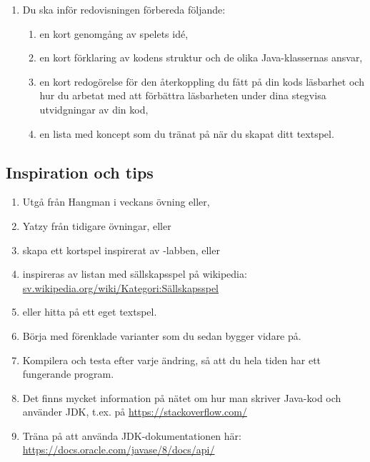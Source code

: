 \begin{enumerate}
  \item Du ska inför redovisningen förbereda följande:
  \begin{enumerate}
    \item en kort genomgång av spelets idé,
    \item en kort förklaring av kodens struktur och de olika Java-klassernas ansvar,
    \item en kort redogörelse för den återkoppling du fått på din kods läsbarhet och hur du arbetat med att förbättra läsbarheten under dina stegvisa utvidgningar av din kod,
    \item en lista med koncept som du tränat på när du skapat ditt textspel.
  \end{enumerate}
\end{enumerate}

\subsection{Inspiration och tips}

\begin{enumerate}
  \item Utgå från Hangman i veckans övning eller,
  \item Yatzy från tidigare övningar, eller
  \item skapa ett kortspel inspirerat av -labben, eller
  \item inspireras av listan med sällskapsspel på wikipedia:\\ \href{https://sv.wikipedia.org/wiki/Kategori:Sällskapsspel}{sv.wikipedia.org/wiki/Kategori:Sällskapsspel}
  \item eller hitta på ett eget textspel.
  \item Börja med förenklade varianter som du sedan bygger vidare på.
  \item Kompilera och testa efter varje ändring, så att du hela tiden har ett fungerande program.
  \item Det finns mycket information på nätet om hur man skriver Java-kod och använder JDK, t.ex. på \url{https://stackoverflow.com/}
  \item Träna på att använda JDK-dokumentationen här:\\ \url{https://docs.oracle.com/javase/8/docs/api/}
\end{enumerate}
